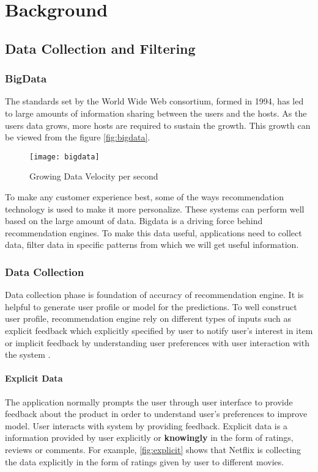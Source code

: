 \chapter{Background}
\section{Data Collection and Filtering}
\subsection{BigData}
The standards set by the World Wide Web consortium, formed in 1994, has led to large amounts of information sharing between the users and the hosts. As the users data grows, more hosts are required to sustain the growth. This growth can be viewed from the figure \autoref{fig:bigdata}.
\\
\begin{figure}[H]
	\centering
	\texttt{[image: bigdata]}
	\caption{Growing Data Velocity per second}
	\label{fig:bigdata}
\end{figure}

\noindent To make any customer experience best, some of the ways recommendation technology is used to make it more personalize. These systems can perform well based on the large amount of data. Bigdata is a driving force behind recommendation engines.
To make this data useful, applications need to collect data, filter data in specific patterns from which we will get useful information. 

\subsection{Data Collection}

Data collection phase is foundation of accuracy of recommendation engine. It is helpful to generate user profile or model for the predictions. To well construct user profile, recommendation engine rely on different types of inputs such as explicit feedback which explicitly specified by user to notify user's interest in item or implicit feedback by understanding user preferences with user interaction with the system \cite{34}. 

\subsubsection{Explicit Data}
The application normally prompts the user through user interface to provide feedback about the product in order to understand user's preferences to improve model. User interacts with system by providing feedback. Explicit data is a information provided by user explicitly or \textbf{knowingly} in the form of ratings, reviews or comments. For example, \autoref{fig:explicit} shows that Netflix is collecting the data explicitly in the form of ratings given by user to different movies. 
\\

